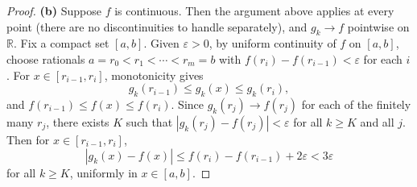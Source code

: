 \documentclass[12 pt]{article}
\begin{document}
\begin{proof}
\textbf{(b)} Suppose $f$ is continuous. Then the argument above applies at every point (there are no discontinuities to handle separately), and $g_k \to f$ pointwise on $\mathbb{R}$. Fix a compact set $[a,b]$. Given $\varepsilon > 0$, by uniform continuity of $f$ on $[a,b]$, choose rationals $a = r_0 < r_1 < \cdots < r_m = b$ with $f(r_i) - f(r_{i-1}) < \varepsilon$ for each $i$. For $x \in [r_{i-1}, r_i]$, monotonicity gives
$$
g_k(r_{i-1}) \leq g_k(x) \leq g_k(r_i),
$$
and $f(r_{i-1}) \leq f(x) \leq f(r_i)$. Since $g_k(r_j) \to f(r_j)$ for each of the finitely many $r_j$, there exists $K$ such that $|g_k(r_j) - f(r_j)| < \varepsilon$ for all $k \geq K$ and all $j$. Then for $x \in [r_{i-1}, r_i]$,
$$
|g_k(x) - f(x)| \leq f(r_i) - f(r_{i-1}) + 2\varepsilon < 3\varepsilon
$$
for all $k \geq K$, uniformly in $x \in [a,b]$.
\end{proof}
\end{document}
